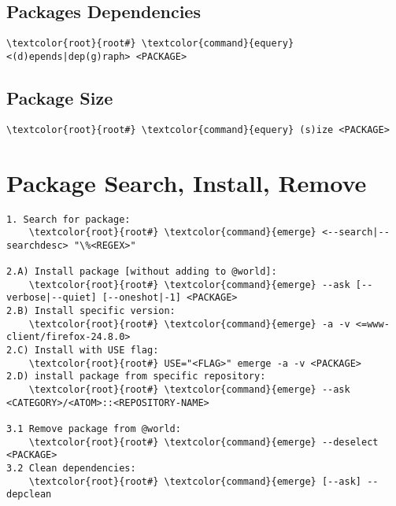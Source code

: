\documentclass[10pt, a4paper, onecolumn, openany]{book}         %
\begin{document}
\subsection{Packages Dependencies}
\begin{Verbatim}[commandchars=\\\{\}]
    \textcolor{root}{root#} \textcolor{command}{equery} <(d)epends|dep(g)raph> <PACKAGE>
\end{Verbatim}

\subsection{Package Size}
\begin{Verbatim}[commandchars=\\\{\}]
    \textcolor{root}{root#} \textcolor{command}{equery} (s)ize <PACKAGE>
\end{Verbatim}

\section{Package Search, Install, Remove}
\begin{Verbatim}[commandchars=\\\{\}]
1. Search for package:
    \textcolor{root}{root#} \textcolor{command}{emerge} <--search|--searchdesc> "\%<REGEX>"
    
2.A) Install package [without adding to @world]:
    \textcolor{root}{root#} \textcolor{command}{emerge} --ask [--verbose|--quiet] [--oneshot|-1] <PACKAGE>
2.B) Install specific version:
    \textcolor{root}{root#} \textcolor{command}{emerge} -a -v <=www-client/firefox-24.8.0>
2.C) Install with USE flag:
    \textcolor{root}{root#} USE="<FLAG>" emerge -a -v <PACKAGE>
2.D) install package from specific repository:
    \textcolor{root}{root#} \textcolor{command}{emerge} --ask <CATEGORY>/<ATOM>::<REPOSITORY-NAME>
    
3.1 Remove package from @world:
    \textcolor{root}{root#} \textcolor{command}{emerge} --deselect <PACKAGE>
3.2 Clean dependencies:
    \textcolor{root}{root#} \textcolor{command}{emerge} [--ask] --depclean
\end{Verbatim}
\end{document}
